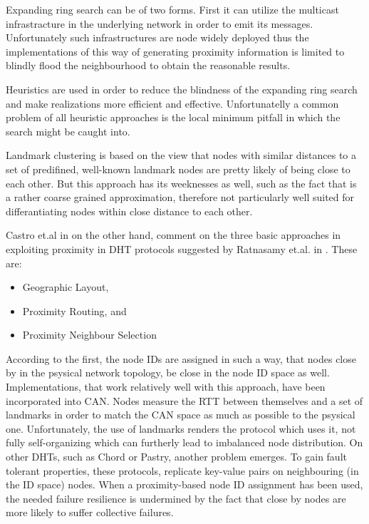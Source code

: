 \documentclass[a4paper,10pt]{article}
\begin{document}
Expanding ring search can be of two forms. First it can utilize the multicast infrastracture in the underlying network in order to emit its messages. Unfortunately such infrastructures are node widely deployed thus the implementations of this way of generating proximity information is limited to blindly flood the neighbourhood to obtain the reasonable results.

Heuristics are used in order to reduce the blindness of the expanding ring search and make realizations more efficient and effective. Unfortunatelly a common problem of all heuristic approaches is the local minimum pitfall in which the search might be caught into.

Landmark clustering is based on the view that nodes with similar distances to a set of predifined, well-known landmark nodes are pretty likely of being close to each other. But this approach has its weeknesses as well, such as the fact that is a rather coarse grained approximation, therefore not particularly well suited for differantiating nodes within close distance to each other.

Castro et.al in \cite{castro_proximitydht_2002, castro_topawareroute_2002} on the other hand, comment on the three basic approaches in exploiting proximity in DHT protocols suggested by Ratnasamy et.al. in \cite{ratnasamy_openq_2002}. These are:
\begin{itemize}
 \item Geographic Layout,
 \item Proximity Routing, and
 \item Proximity Neighbour Selection
\end{itemize}

According to the first, the node IDs are assigned in such a way, that nodes close by in the psysical network topology, be close in the node ID space as well. Implementations, that work relatively well with this approach, have been incorporated into CAN. Nodes measure the RTT between themselves and a set of landmarks in order to match the CAN space as much as possible to the psysical one. Unfortunately, the use of landmarks renders the protocol which uses it, not fully self-organizing which can furtherly lead to imbalanced node distribution. On other DHTs, such as Chord or Pastry, another problem emerges. To gain fault tolerant properties, these protocols, replicate key-value pairs on neighbouring (in the ID space) nodes. When a proximity-based node ID assignment has been used, the needed failure resilience is undermined by the fact that close by nodes are more likely to suffer collective failures.
\end{document}
